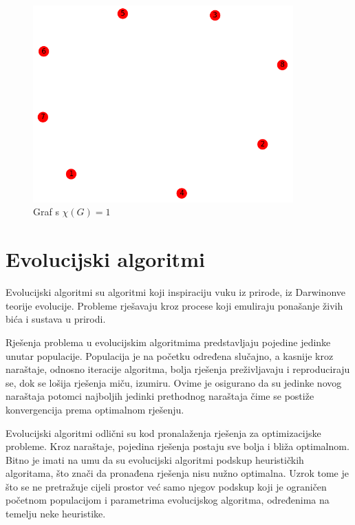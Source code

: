 \documentclass[times, utf8, zavrsni]{fer}
\begin{document}
\begin{figure}[htb]
\centering
\includegraphics[width=10cm]{images/8_vertices_nepovezane.png}
\caption{Graf s $\chi(G)=1$}
\label{fig:graf s kromatskim brojem 1}
\end{figure}

\chapter{Evolucijski algoritmi}

Evolucijski algoritmi su algoritmi koji inspiraciju vuku iz prirode, iz Darwinonve teorije evolucije. Probleme rješavaju kroz procese koji emuliraju ponašanje živih bića i sustava u prirodi.

Rješenja problema u evolucijskim algoritmima predstavljaju pojedine jedinke unutar populacije. Populacija je na početku određena slučajno, a kasnije kroz naraštaje, odnosno iteracije algoritma, bolja rješenja preživljavaju i reproduciraju se, dok se lošija rješenja miču, izumiru. Ovime je osigurano da su jedinke novog naraštaja potomci najboljih jedinki prethodnog naraštaja čime se postiže konvergencija prema optimalnom rješenju.

Evolucijski algoritmi odlični su kod pronalaženja rješenja za optimizacijske probleme. Kroz naraštaje, pojedina rješenja postaju sve bolja i bliža optimalnom. Bitno je imati na umu da su evolucijski algoritmi podskup heurističkih algoritama, što znači da pronađena rješenja nisu nužno optimalna. Uzrok tome je što se ne pretražuje cijeli prostor već samo njegov podskup koji je ograničen početnom populacijom i parametrima evolucijskog algoritma, određenima na temelju neke heuristike.
\end{document}

